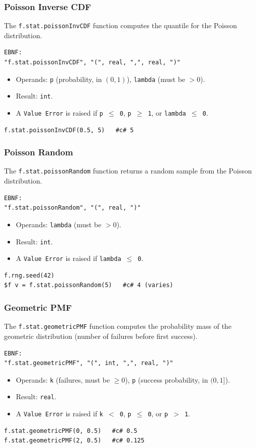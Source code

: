\subsubsection{Poisson Inverse CDF}
The \texttt{f.stat.poissonInvCDF} function computes the quantile for the Poisson distribution.
\begin{verbatim}
EBNF:
"f.stat.poissonInvCDF", "(", real, ",", real, ")"
\end{verbatim}
\begin{itemize}
\item Operands: \texttt{p} (probability, in $(0, 1)$), \texttt{lambda} (must be $> 0$).
\item Result: \texttt{int}.
\item A \texttt{Value Error} is raised if \texttt{p $\leq$ 0}, \texttt{p $\geq$ 1}, or \texttt{lambda $\leq$ 0}.
\end{itemize}
\begin{verbatim}
f.stat.poissonInvCDF(0.5, 5)   #c# 5
\end{verbatim}

\subsubsection{Poisson Random}
The \texttt{f.stat.poissonRandom} function returns a random sample from the Poisson distribution.
\begin{verbatim}
EBNF:
"f.stat.poissonRandom", "(", real, ")"
\end{verbatim}
\begin{itemize}
\item Operands: \texttt{lambda} (must be $> 0$).
\item Result: \texttt{int}.
\item A \texttt{Value Error} is raised if \texttt{lambda $\leq$ 0}.
\end{itemize}
\begin{verbatim}
f.rng.seed(42)
$f v = f.stat.poissonRandom(5)   #c# 4 (varies)
\end{verbatim}

\subsubsection{Geometric PMF}
The \texttt{f.stat.geometricPMF} function computes the probability mass of the geometric distribution (number of failures before first success).
\begin{verbatim}
EBNF:
"f.stat.geometricPMF", "(", int, ",", real, ")"
\end{verbatim}
\begin{itemize}
\item Operands: \texttt{k} (failures, must be $\geq 0$), \texttt{p} (success probability, in $(0, 1]$).
\item Result: \texttt{real}.
\item A \texttt{Value Error} is raised if \texttt{k $<$ 0}, \texttt{p $\leq$ 0}, or \texttt{p $>$ 1}.
\end{itemize}
\begin{verbatim}
f.stat.geometricPMF(0, 0.5)   #c# 0.5
f.stat.geometricPMF(2, 0.5)   #c# 0.125
\end{verbatim}

